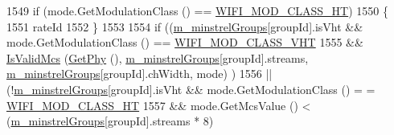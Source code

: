 \begin{DoxyCode}
1549                   \textcolor{keywordflow}{if} (mode.GetModulationClass () == \hyperlink{namespacens3_aa999e1221606a2b21b1eb33c2007c217a6ac45cac36cc4454649435d24ebf349c}{WIFI\_MOD\_CLASS\_HT})
1550                     \{
1551                       rateId %
1552                     \}
1553 
1554                   \textcolor{keywordflow}{if} ((\hyperlink{classns3_1_1MinstrelHtWifiManager_a231741ce3f38417925019aa598570468}{m\_minstrelGroups}[groupId].isVht && mode.GetModulationClass () == 
      \hyperlink{namespacens3_aa999e1221606a2b21b1eb33c2007c217a9863e4342bf5c238c74dddfc4d96c67e}{WIFI\_MOD\_CLASS\_VHT}                       
1555                        && \hyperlink{classns3_1_1MinstrelHtWifiManager_a6e96fca0f8a7295e41cdbeea9d7dae32}{IsValidMcs} (\hyperlink{classns3_1_1WifiRemoteStationManager_ab92b49cf78e0b72a51f5d13a1f15e242}{GetPhy} (), 
      \hyperlink{classns3_1_1MinstrelHtWifiManager_a231741ce3f38417925019aa598570468}{m\_minstrelGroups}[groupId].streams, \hyperlink{classns3_1_1MinstrelHtWifiManager_a231741ce3f38417925019aa598570468}{m\_minstrelGroups}[groupId].chWidth, mode)
      )   
1556                       || (!\hyperlink{classns3_1_1MinstrelHtWifiManager_a231741ce3f38417925019aa598570468}{m\_minstrelGroups}[groupId].isVht &&  mode.GetModulationClass () =
      = \hyperlink{namespacens3_aa999e1221606a2b21b1eb33c2007c217a6ac45cac36cc4454649435d24ebf349c}{WIFI\_MOD\_CLASS\_HT}                  
1557                           && mode.GetMcsValue () < (\hyperlink{classns3_1_1MinstrelHtWifiManager_a231741ce3f38417925019aa598570468}{m\_minstrelGroups}[groupId].streams * 8) 
                                           

\end{DoxyCode}
